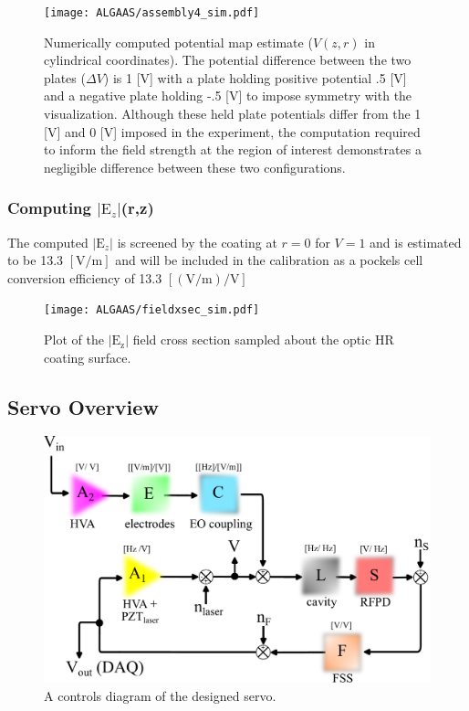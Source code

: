 \begin{figure}[H]
  \centering
  \texttt{[image: ALGAAS/assembly4\_sim.pdf]}
  \caption{Numerically computed potential map estimate ($V(z,r)$ in cylindrical coordinates). The potential difference between the two plates ($\Delta V$) is 1 [V] with a plate holding positive potential .5 [V] and a negative plate holding -.5 [V] to impose symmetry with the visualization. Although these held plate potentials differ from the 1 [V] and 0 [V] imposed in the experiment, the computation required to inform the field strength at the region of interest demonstrates a negligible difference between these two configurations.} 
  \label{fig:poissoncalcoutput}
\end{figure}


\subsubsection*{Computing $|\mathrm{E}_z|$(r,z)}

The computed $|\mathrm{E}_z|$ is screened by the coating at $r = 0$ for $V = 1$ and is estimated to be 13.3 $[\mathrm{V}/\mathrm{m}]$ and will be included in the calibration as a pockels cell conversion efficiency of 13.3 $[(\mathrm{V} / \mathrm{m}) / \mathrm{V}]$  

\begin{figure}[H]
    \texttt{[image: ALGAAS/fieldxsec\_sim.pdf]}
    \caption{Plot of the $| \mathrm{E}_\mathrm{z} |$ field cross section sampled about the optic HR coating surface.}
\label{fig:Ez}
\end{figure}

\iffalse
\subsection{Servo Overview}
\begin{figure}[!ht]
	\includegraphics[width=\textwidth]{figs/ALGAAS/pock_control_diagram.pdf}
	\caption{A controls diagram of the designed servo.}
	\label{fig:pock_control_servo}
\end{figure}

